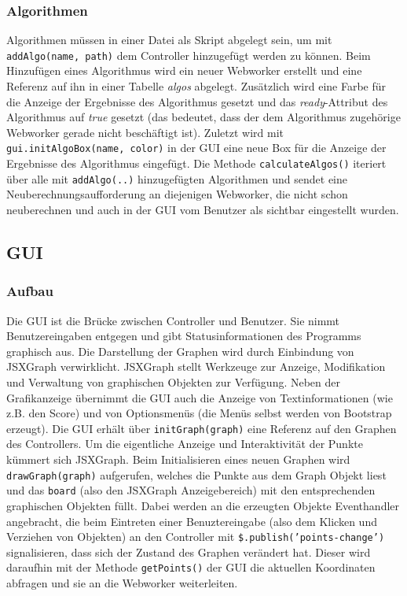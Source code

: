 \documentclass[a4paper,twocolumn]{scrartcl}
\begin{document}
\subsubsection{Algorithmen}
Algorithmen müssen in einer Datei als Skript abgelegt sein, um mit \texttt{addAlgo(name, path)} dem Controller hinzugefügt werden zu können. Beim Hinzufügen eines Algorithmus wird ein neuer Webworker erstellt und eine Referenz auf ihn in einer Tabelle \emph{algos} abgelegt. Zusätzlich wird eine Farbe für die Anzeige der Ergebnisse des Algorithmus gesetzt und das \emph{ready}-Attribut des Algorithmus auf \emph{true} gesetzt (das bedeutet, dass der dem Algorithmus zugehörige Webworker gerade nicht beschäftigt ist). Zuletzt wird mit \texttt{gui.initAlgoBox(name, color)} in der GUI eine neue Box für die Anzeige der Ergebnisse des Algorithmus eingefügt.
Die Methode \texttt{calculateAlgos()} iteriert über alle mit \texttt{addAlgo(..)} hinzugefügten Algorithmen und sendet eine Neuberechnungsaufforderung an diejenigen Webworker, die nicht schon neuberechnen und auch in der GUI vom Benutzer als sichtbar eingestellt wurden.

\subsection{GUI}
\subsubsection{Aufbau}
Die GUI ist die Brücke zwischen Controller und Benutzer. Sie nimmt Benutzereingaben entgegen und gibt Statusinformationen des Programms graphisch aus. Die Darstellung der Graphen wird durch Einbindung von JSXGraph verwirklicht. JSXGraph stellt Werkzeuge zur Anzeige, Modifikation und Verwaltung von graphischen Objekten zur Verfügung. Neben der Grafikanzeige übernimmt die GUI auch die Anzeige von Textinformationen (wie z.B. den Score) und von Optionsmenüs (die Menüs selbst werden von Bootstrap erzeugt).
Die GUI erhält über \texttt{initGraph(graph)} eine Referenz auf den Graphen des Controllers.
Um die eigentliche Anzeige und Interaktivität der Punkte kümmert sich JSXGraph. Beim Initialisieren eines neuen Graphen wird \texttt{drawGraph(graph)} aufgerufen, welches die Punkte aus dem Graph Objekt liest und das \texttt{board} (also den JSXGraph Anzeigebereich) mit den entsprechenden graphischen Objekten füllt. Dabei werden an die erzeugten Objekte Eventhandler angebracht, die beim Eintreten einer Benuztereingabe (also dem Klicken und Verziehen von Objekten) an den Controller mit \texttt{\$.publish('points-change')} signalisieren, dass sich der Zustand des Graphen verändert hat. Dieser wird daraufhin mit der Methode \texttt{getPoints()} der GUI die aktuellen Koordinaten abfragen und sie an die Webworker weiterleiten.
\end{document}
